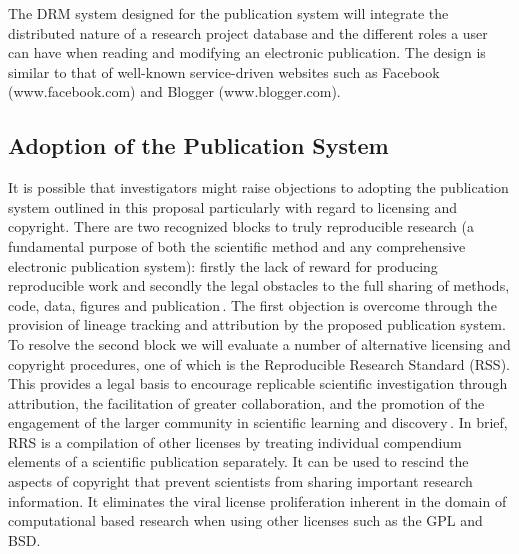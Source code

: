 \documentclass[12pt]{article}
\begin{document}
\begin{enumerate}
The DRM system designed for the publication system will integrate the distributed nature of a research project database and the different roles a user can have when reading and modifying an electronic publication. The design is similar to that of well-known service-driven websites such as Facebook (www.facebook.com) and Blogger (www.blogger.com).
\end{enumerate}

\subsection*{Adoption of the Publication System}

It is possible that investigators might raise objections to adopting the publication system outlined in this proposal particularly with regard to licensing and copyright. There are two recognized blocks to truly reproducible research (a fundamental purpose of both the scientific method and any comprehensive electronic publication system): firstly the lack of reward for producing reproducible work and secondly the legal obstacles to the full sharing of methods, code, data, figures and publication\,\cite{Stodden:2009cq}. The first objection is overcome through the provision of lineage tracking and attribution by the proposed publication system. To resolve the second block we will evaluate a number of alternative licensing and copyright procedures, one of which is the Reproducible Research Standard (RSS).  This provides a legal basis to encourage replicable scientific investigation through attribution, the facilitation of greater collaboration, and the promotion of the engagement of the larger community in scientific learning and discovery\,\cite{Stodden:2009cq}. In brief, RRS is a compilation of other licenses by treating individual compendium elements of a scientific publication separately. It can be used to rescind the aspects of copyright that prevent scientists from sharing important research information.  It eliminates the viral license proliferation inherent in the domain of computational based research when using other licenses such as the GPL and BSD.



\end{document}
